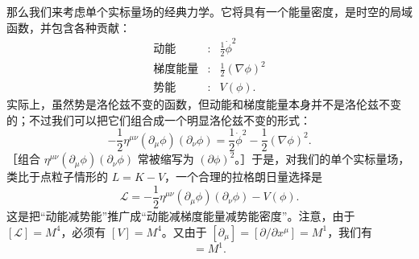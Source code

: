 那么我们来考虑单个实标量场的经典力学。它将具有一个能量密度，是时空的局域函数，并包含各种贡献：
\begin{equation*}
\begin{array}{lll}
\text{动能} &:& \frac{1}{2}\dot{\phi}^{2}\\
\text{梯度能量} &:& \frac{1}{2}(\nabla\phi)^{2}\\
\text{势能} &:& V(\phi).
\end{array}
\tag{1.146}
\end{equation*}
实际上，虽然势是洛伦兹不变的函数，但动能和梯度能量本身并不是洛伦兹不变的；不过我们可以把它们组合成一个明显洛伦兹不变的形式：
\begin{equation*}
-\frac{1}{2}\eta^{\mu\nu}(\partial_{\mu}\phi)(\partial_{\nu}\phi) = \frac{1}{2}\dot{\phi}^{2} - \frac{1}{2}(\nabla\phi)^{2}.
\tag{1.147}
\end{equation*}
［组合 $\eta^{\mu\nu}(\partial_{\mu}\phi)(\partial_{\nu}\phi)$ 常被缩写为 $(\partial\phi)^{2}$。］于是，对我们的单个实标量场，类比于点粒子情形的 $L=K-V$，一个合理的拉格朗日量选择是
\begin{equation*}
\mathcal{L} = -\frac{1}{2}\eta^{\mu\nu}(\partial_{\mu}\phi)(\partial_{\nu}\phi) - V(\phi).
\tag{1.148}
\end{equation*}
这是把“动能减势能”推广成“动能减梯度能量减势能密度”。注意，由于 $[\mathcal{L}]=M^{4}$，必须有 $[V]=M^{4}$。又由于 $[\partial_{\mu}]=[\partial/\partial x^{\mu}]=M^{1}$，我们有
\begin{equation*}
[\phi] = M^{1}.
\tag{1.149}
\end{equation*}


